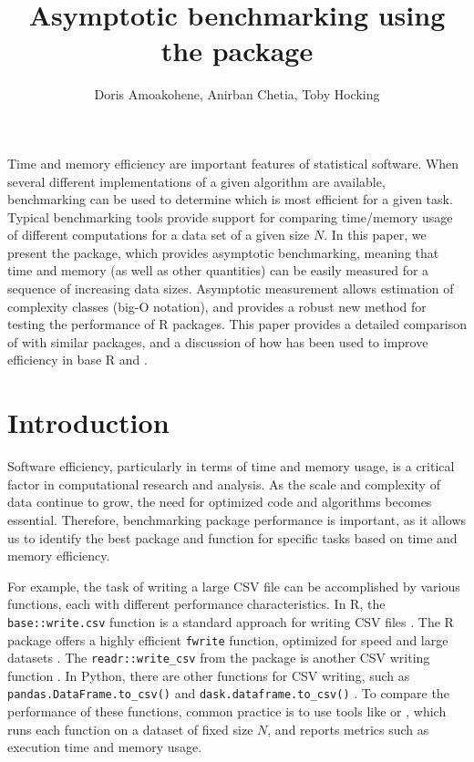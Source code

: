 \title{Asymptotic benchmarking using the  package}
\author{Doris Amoakohene, Anirban Chetia, Toby Hocking}

\maketitle

\abstract{}
Time and memory efficiency are important features of statistical software.
When several different implementations of a given algorithm are available, benchmarking can be used to determine which is most efficient for a given task.
Typical benchmarking tools provide support for comparing time/memory usage of different computations for a data set of a given size $N$.
In this paper, we present the  package, which provides asymptotic benchmarking, meaning that time and memory (as well as other quantities) can be easily measured for a sequence of increasing data sizes. 
Asymptotic measurement allows estimation of complexity classes (big-O notation), and provides a robust new method for testing the performance of R packages.
This paper provides a detailed comparison of  with similar packages, and a discussion of how  has been used to improve efficiency in base R and . 

\section{Introduction}

Software efficiency, particularly in terms of time and memory usage, is a critical factor in computational research and analysis. As the scale and complexity of data continue to grow, the need for optimized code and algorithms becomes essential. 
Therefore, benchmarking package performance is important, as it allows us to identify the best package and function for specific tasks based on time and memory efficiency. 

For example, the task of writing a large CSV file can be accomplished by various functions, each with different performance characteristics. 
In R, the \texttt{base::write.csv} function is a standard approach for writing CSV files \citep{baseR}.
The R package  offers a highly efficient \texttt{fwrite} function, optimized for speed and large datasets \citep{data.table}. 
The \texttt{readr::write\_csv} from the  package is another CSV writing function \citep{readr}.
In Python, there are other functions for CSV writing, such as \texttt{pandas.DataFrame.to\_csv()} and \texttt{dask.dataframe.to\_csv()}  \citep{pandas, dask}.
To compare the performance of these functions, common practice is to use tools like  \citep{microbenchmark} or  \citep{bench}, which runs each function on a dataset of fixed size $N$, and reports metrics such as execution time and memory usage.  

